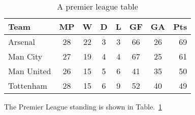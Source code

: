 \documentclass[10pt, a4paper]{article}
\begin{document}
\setcounter{table}{10}
\begin{table}\center

\begin{tabular}{l*{6}{c}r}
Team		& MP	& W & D & L & GF  & GA & Pts \\
\hline
Arsenal 		& 28		& 22 & 3 & 3 & 66 & 26 & 69  \\
Man City          	& 27 		& 19 & 4 & 4 &  67 & 25 &  61  \\
Man United	& 26 		& 15 & 5 & 6 &  41 & 35 &  50  \\
Tottenham     	& 28 		& 15 & 6 & 9 &  52 & 40 &  49  \\
\end{tabular}

{\caption{\label{tab:premierleague} A premier league table}}
\end{table}

The Premier League standing is shown in Table.~\ref{tab:premierleague}
\end{document}
